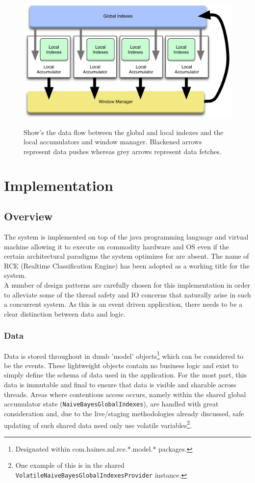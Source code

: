 \documentclass[a4paper,11pt]{scrreprt}
\begin{document}
\begin{figure}[h!]
\centering
\caption{Show's the data flow between the global and local indexes and the local accumulators and window manager. Blackened arrows represent data pushes whereas grey arrows represent data fetches.}
\includegraphics[scale=0.35, trim=0 0 0 12, clip=true] {indexes.pdf}
\label{fig:indexes}
\end{figure}

\chapter{Implementation}
\VerbatimFootnotes
\section{Overview}
The system is implemented on top of the java programming language and virtual machine allowing it to execute on commodity hardware and OS even if the certain architectural paradigms the system optimizes for are absent. The name of RCE (Realtime Classification Engine) has been adopted as a working title for the system. \\A number of design patterns are carefully chosen for this implementation in order to alleviate some of the thread safety and IO concerns that naturally arise in such a concurrent system. As this is an event driven application, there needs to be a clear distinction between data and logic. 
\subsection{Data}
Data is stored throughout in dumb 'model' objects\footnote{Designated within com.haines.ml.rce.*.model.* packages.} which can be considered to be the events. These lightweight objects contain no business logic and exist to simply define the schema of data used in the application. For the most part, this data is immutable and final to ensure that data is visible and sharable across threads. Areas where contentious access occurs, namely within the shared global accumulator state (\verb|NaiveBayesGlobalIndexes|), are handled with great consideration and, due to the live/staging methodologies already discussed, safe updating of such shared data need only use volatile variables\footnote{One example of this is in the shared \verb|VolatileNaiveBayesGlobalIndexesProvider| instance.}. 
\end{document}
